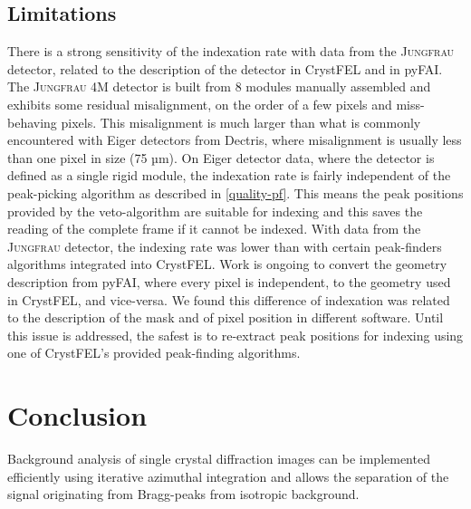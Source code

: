 \documentclass[preprint]{iucr}              %
\begin{document}
\subsection{Limitations}
There is a strong sensitivity of the indexation rate with data from the \textsc{Jungfrau} detector, related to the description of the detector in CrystFEL and in pyFAI.
The \textsc{Jungfrau} 4M detector is built from 8 modules manually assembled and exhibits some residual misalignment, on the order of a few pixels and miss-behaving pixels.
This misalignment is much larger than what is commonly encountered with Eiger detectors from Dectris, where misalignment is usually less than one pixel in size (75 µm).
On Eiger detector data, where the detector is defined as a single rigid module, the indexation rate is fairly independent of the peak-picking algorithm as described in \ref{quality-pf}.
This means the peak positions provided by the veto-algorithm are suitable for indexing and this saves the reading of the complete frame if it cannot be indexed.
With data from the \textsc{Jungfrau} detector, the indexing rate was lower than with certain peak-finders algorithms integrated into CrystFEL. 
Work is ongoing to convert the geometry description from pyFAI, where every pixel is independent, to the geometry used in CrystFEL, and vice-versa. 
We found this difference of indexation was related to the description of the mask and of pixel position in different software.
Until this issue is addressed, the safest is to re-extract peak positions for indexing using one of CrystFEL's provided peak-finding algorithms. 

\section{Conclusion}

Background analysis of single crystal diffraction images can be implemented efficiently using iterative azimuthal integration and allows the separation of the signal originating from Bragg-peaks from isotropic background.
\end{document}
